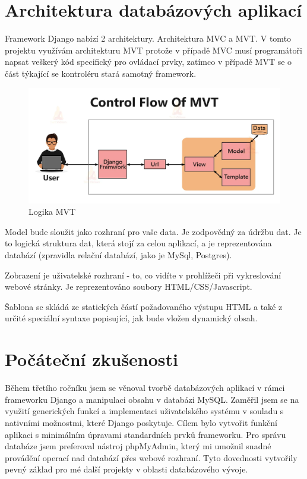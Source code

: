 \documentclass[12pt, a4paper,
oneside,      %
openright
]{report}
\begin{document}
\section{Architektura databázových aplikací}
\label{sec:architektura}
Framework Django nabízí 2 architektury. Architektura MVC a MVT. V tomto projektu využívám architekturu MVT protože v případě MVC musí programátoři napsat veškerý kód specifický pro ovládací prvky, zatímco v případě MVT se o část týkající se kontroléru stará samotný framework. 
\begin{figure}[h]
			\centering
			\includegraphics[width=1\linewidth]{image/mvt.png} 
			\caption{Logika MVT}
			\label{fig:mvc}
\end{figure}
\newpage
Model bude sloužit jako rozhraní pro vaše data. Je zodpovědný za údržbu dat. Je to logická struktura dat, která stojí za celou aplikací, a je reprezentována databází (zpravidla relační databází, jako je MySql, Postgres).

Zobrazení je uživatelské rozhraní - to, co vidíte v prohlížeči při vykreslování webové stránky. Je reprezentováno soubory HTML/CSS/Javascript.

Šablona se skládá ze statických částí požadovaného výstupu HTML a také z určité speciální syntaxe popisující, jak bude vložen dynamický obsah.
\section[Počáteční zkušenosti]{Počáteční zkušenosti}
Během třetího ročníku jsem se věnoval tvorbě databázových aplikací v rámci frameworku Django a manipulaci obsahu v databázi MySQL. Zaměřil jsem se na využití generických funkcí a implementaci uživatelského systému v souladu s nativními možnostmi, které Django poskytuje. Cílem bylo vytvořit funkční aplikaci s minimálním úpravami standardních prvků frameworku. Pro správu databáze jsem preferoval nástroj phpMyAdmin, který mi umožnil snadné provádění operací nad databází přes webové rozhraní. Tyto dovednosti vytvořily pevný základ pro mé další projekty v oblasti databázového vývoje.
\end{document}
